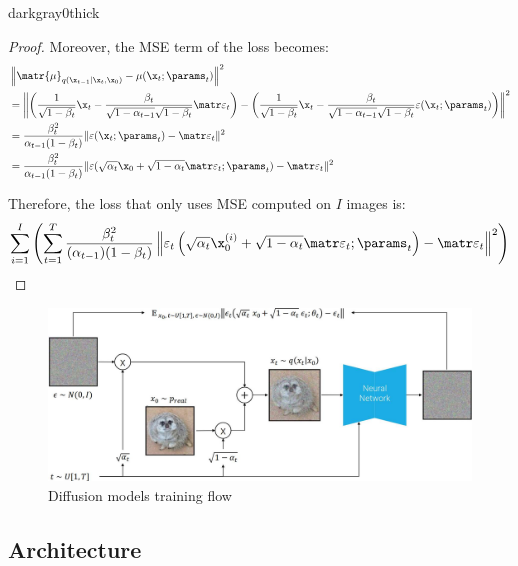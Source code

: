 \begin{description}
\begin{marginbar}{darkgray}{0}{thick}
\begin{theorem}
\begin{proof}
                Moreover, the MSE term of the loss becomes:
                \[
                    \begin{split}
                        &\left\Vert \matr{\mu}_{q(\x_{t-1} \mid \x_t, \x_0)} - \mu(\x_t; \params_t) \right\Vert^2 \\
                        &= \left\Vert \left( \frac{1}{\sqrt{1-\beta_t}}\x_t - \frac{\beta_t}{\sqrt{1-\alpha_{t-1}}\sqrt{1-\beta_t}} \noise_t \right) - \left( \frac{1}{\sqrt{1-\beta_t}}\x_t - \frac{\beta_t}{\sqrt{1-\alpha_{t-1}}\sqrt{1-\beta_t}} \varepsilon(\x_t; \params_t) \right) \right\Vert^2 \\
                        &= \frac{\beta_t^2}{\alpha_{t-1}(1-\beta_t)} \Vert \varepsilon(\x_t; \params_t) - \noise_t \Vert^2 \\
                        &= \frac{\beta_t^2}{\alpha_{t-1}(1-\beta_t)} \Vert \varepsilon(\sqrt{\alpha_t}\x_0 + \sqrt{1-\alpha_t}\noise_t; \params_t) - \noise_t \Vert^2
                    \end{split}
                \]

                Therefore, the loss that only uses MSE computed on $I$ images is:
                \[ \sum_{i=1}^{I} \left( \sum_{t=1}^{T} \frac{\beta_t^2}{(\alpha_{t-1})(1-\beta_t)} \left\Vert \varepsilon_t\left( \sqrt{\alpha_t} \x_0^{(i)} + \sqrt{1-\alpha_t} \noise_t; \params_t \right) - \noise_t \right\Vert^2 \right) \]
            \end{proof}
        \end{theorem}
        \end{marginbar}

    \begin{figure}[H]
        \centering
        \includegraphics[width=0.9\linewidth]{./img/diffusion_model_training.jpg}
        \caption{Diffusion models training flow}
    \end{figure}
\end{description}


\subsection{Architecture}


